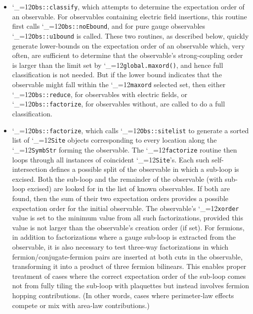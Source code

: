 \documentclass [12pt]{article}
\makeatletter
\renewcommand{\tt}{\begingroup\catcode`_=12\def\_{\string_}\tt@}
\newcommand{\tt@}[1]{\texttt{#1}\endgroup}
\makeatother
\begin{document}
\begin{itemize}
    \item
	\tt{Obs::classify}, which attempts to determine
	the expectation order of an observable.
	For observables containing electric field insertions,
	this routine first calls \tt{Obs::noEbound},
	and for pure gauge observables
	\tt{Obs::u1bound} is called.
	These two routines, as described below, quickly
	generate lower-bounds on the expectation order of
	an observable which, very often, are sufficient to
	determine that the observable's strong-coupling order
	is larger than the limit set by \tt{global.maxord()},
	and hence full classification is not needed.
	But if the lower bound indicates that the observable
	might fall within the \tt{maxord} selected set, then
	either \tt{Obs::reduce}, for observables with electric
	fields, or \tt{Obs::factorize}, for observables without,
	are called to do a full classification.

    \item
	\tt{Obs::factorize}, which calls \tt{Obs::sitelist}
	to generate a sorted list of \tt{Site} objects
	corresponding to every location along the \tt{SymbStr}
	forming the observable.
	The \tt{factorize} routine then loops through
	all instances of coincident \tt{Site}'s.
	Each such self-intersection defines a possible split of
	the observable in which a sub-loop is excised.
	Both the sub-loop and the remainder of the observable
	(with sub-loop excised) are looked for in the list
	of known observables.
	If both are found, then the sum of their two
	expectation orders provides a possible expectation
	order for the initial observable.
	The observable's \tt{xorder} value is set to
	the minimum value from all such factorizations,
	provided this value is not larger than the
	observable's creation order (if set).
	For fermions, in addition to factorizations where
	a gauge sub-loop is extracted from the observable,
	it is also necessary to test three-way factorizations
	in which fermion/conjugate-fermion pairs are inserted
	at both cuts in the observable, transforming it into
	a product of three fermion bilinears.  This enables
	proper treatment of cases where the correct
	expectation order of the sub-loop comes not from
	fully tiling the sub-loop with plaquettes but
	instead involves fermion hopping contributions.
	(In other words, cases where perimeter-law effects
	compete or mix with area-law contributions.)


\end{itemize}
\end{document}
